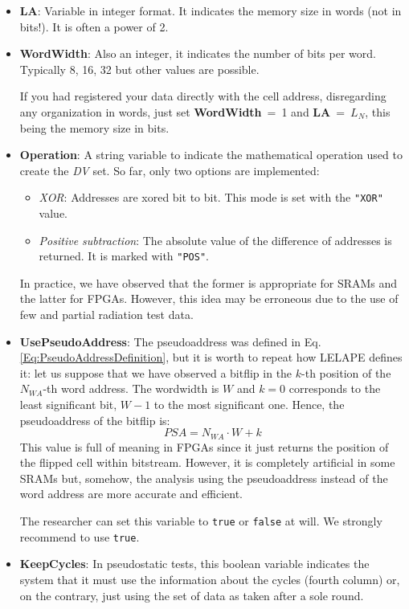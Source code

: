 \begin{itemize}
	\item \textbf{LA}: Variable in integer format. It indicates the memory size in words (not in bits!). It is often a power of 2.
	\item \textbf{WordWidth}: Also an integer, it indicates the number of bits per word. Typically 8, 16, 32 but other values are possible.
	
	If you had registered your data directly with the cell address, disregarding any organization in words, just set \textbf{WordWidth}~=~1 and \textbf{LA}~=~\(L_N\), this being the memory size in bits.
	
	\item \textbf{Operation}: A string variable to indicate the mathematical operation used to create the \textit{DV} set. So far, only two options are implemented:
	\begin{itemize}
		\item \textit{XOR}: Addresses are xored bit to bit. This mode is set with the \texttt{"XOR"} value.
		\item \textit{Positive subtraction}: The absolute value of the difference of addresses is returned. It is marked with \texttt{"POS"}. 
	\end{itemize}

	In practice, we have observed that the former is appropriate for SRAMs and the latter for FPGAs. However, this idea may be erroneous due to the use of few and partial radiation test data.
	\item \textbf{UsePseudoAddress}: The pseudoaddress was defined  in Eq. \ref{Eq:PseudoAddressDefinition}, but it is worth to repeat how LELAPE defines it: let us suppose that we have observed a bitflip in the $k$-th position of the $N_{WA}$-th word address. The wordwidth is $W$ and $k=0$ corresponds to the least significant bit, $W-1$ to the most significant one. Hence, the pseudoaddress of the bitflip is:
	\begin{equation}
		PSA = N_{WA} \cdot W + k
		\label{Eq:PseudoAddress}
	\end{equation}
	This value is full of meaning in FPGAs since it just returns the position of the flipped cell within bitstream. However, it is completely artificial in some SRAMs but, somehow, the analysis using the pseudoaddress instead of the word address are more accurate and efficient. 
	
	The researcher can set this variable to \texttt{true} or \texttt{false} at will. We strongly recommend to use \texttt{true}.
	\item \textbf{KeepCycles}: In pseudostatic tests, this boolean variable indicates the system that it must use the information about the cycles (fourth column) or, on the contrary, just using the set of data as taken after a sole round. 
	

\end{itemize}
